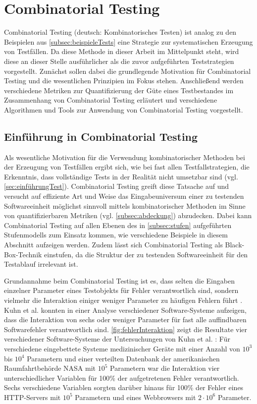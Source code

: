 \section{Combinatorial Testing}\label{sec:combinatorialTesting}

Combinatorial Testing (deutsch: Kombinatorisches Testen) ist analog zu den Beispielen aus \autoref{subsec:beispieleTests} eine Strategie zur systematischen Erzeugung von Testfällen. Da diese Methode in dieser Arbeit im Mittelpunkt steht, wird diese an dieser Stelle ausführlicher als die zuvor aufgeführten Teststrategien vorgestellt. Zunächst sollen dabei die grundlegende Motivation für Combinatorial Testing und die wesentlichen Prinzipien im Fokus stehen. Anschließend werden verschiedene Metriken zur Quantifizierung der Güte eines Testbestandes im Zusammenhang von Combinatorial Testing erläutert und verschiedene Algorithmen und Tools zur Anwendung von Combinatorial Testing vorgestellt.

\subsection{Einführung in Combinatorial Testing}\label{subsec:einführungCombinatorial}

Als wesentliche Motivation für die Verwendung kombinatorischer Methoden bei der Erzeugung von Testfällen ergibt sich, wie bei fast allen Testfallstrategien, die Erkenntnis, dass vollständige Tests in der Realität nicht umsetzbar sind (vgl. \autoref{sec:einführungTest}). Combinatorial Testing greift diese Tatsache auf und versucht auf effiziente Art und Weise das Eingabeuniversum einer zu testenden Softwareeinheit möglichst sinnvoll mittels kombinatorischer Methoden im Sinne von quantifizierbaren Metriken (vgl. \autoref{subsec:abdeckung}) abzudecken. Dabei kann Combinatorial Testing auf allen Ebenen des in \autoref{subsec:stufen} aufgeführten Stufenmodells zum Einsatz kommen, wie verschiedene Beispiele in diesem Abschnitt aufzeigen werden. Zudem lässt sich Combinatorial Testing als Black-Box-Technik einstufen, da die Struktur der zu testenden Softwareeinheit für den Testablauf irrelevant ist.

Grundannahme beim Combinatorial Testing ist es, dass selten die Eingaben einzelner Parameter eines Testobjekts für Fehler verantwortlich sind, sondern vielmehr die Interaktion einiger weniger Parameter zu häufigen Fehlern führt \cite{kuhn2010practical}. Kuhn et al. \cite{kuhn2004error} konnten in einer Analyse verschiedener Software-Systeme aufzeigen, dass die Interaktion von sechs oder weniger Parameter für fast alle auffindbaren Softwarefehler verantwortlich sind. \autoref{fig:fehlerInteraktion} zeigt die Resultate vier verschiedener Software-Systeme der Untersuchungen von Kuhn et al. \cite{kuhn2004error}: Für verschiedene eingebettete Systeme medizinischer Geräte mit einer Anzahl von $10^3$ bis $10^4$ Parametern und einer verteilten Datenbank der amerikanischen Raumfahrtbehörde NASA mit $10^5$ Parametern war die Interaktion vier unterschiedlicher Variablen für 100\% der aufgetretenen Fehler verantwortlich. Sechs verschiedene Variablen sorgten darüber hinaus für 100\% der Fehler eines HTTP-Servers mit $10^5$ Parametern und eines Webbrowsers mit $2 \cdot 10^6$ Parameter.

